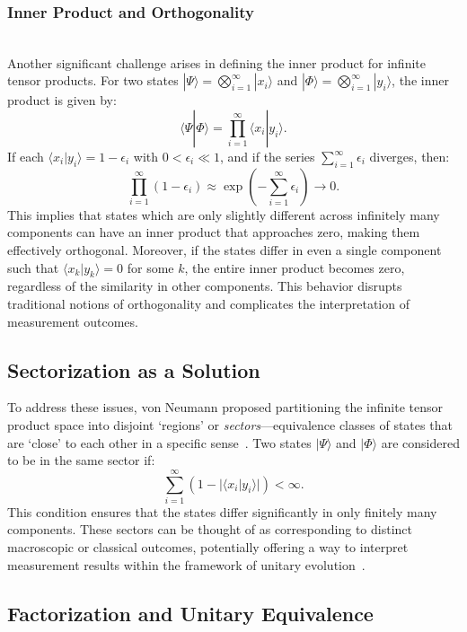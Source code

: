 \documentclass[shortAfour,sageh,times]{sagej}
\begin{document}
\subsubsection{Inner Product and Orthogonality} \hfill\\[-0.1in]

Another significant challenge arises in defining the inner product for infinite tensor products. For two states $|\Psi\rangle = \bigotimes_{i=1}^{\infty} | x _i\rangle$ and $|\Phi\rangle = \bigotimes_{i=1}^{\infty} | y _i\rangle$, the inner product is given by:
\[
\langle \Psi | \Phi \rangle = \prod_{i=1}^{\infty} \langle  x _i |  y _i \rangle.
\]
If each $\langle  x _i |  y _i \rangle = 1 - \epsilon_i$ with $0 < \epsilon_i \ll 1$, and if the series $\sum_{i=1}^{\infty} \epsilon_i$ diverges, then:
\[
\prod_{i=1}^{\infty} (1 - \epsilon_i) \approx \exp\left(-\sum_{i=1}^{\infty} \epsilon_i\right) \to 0.
\]
This implies that states which are only slightly different across infinitely many components can have an inner product that approaches zero, making them effectively orthogonal. Moreover, if the states differ in even a single component such that $\langle  x _k |  y _k \rangle = 0$ for some $k$, the entire inner product becomes zero, regardless of the similarity in other components. This behavior disrupts traditional notions of orthogonality and complicates the interpretation of measurement outcomes.

\subsection{Sectorization as a Solution}
\label{2025-idi-sectorization}

To address these issues, von Neumann proposed partitioning the infinite tensor product space into disjoint `regions' or \textit{sectors}---equivalence classes of states that are `close' to each other in a specific sense~\citep{vonNeumann1939}. Two states $|\Psi\rangle$ and $|\Phi\rangle$ are considered to be in the same sector if:
\[
\sum_{i=1}^{\infty} (1 - |\langle  x _i |  y _i \rangle|) < \infty.
\]
This condition ensures that the states differ significantly in only finitely many components. These sectors can be thought of as corresponding to distinct macroscopic or classical outcomes, potentially offering a way to interpret measurement results within the framework of unitary evolution~\citep{Grangier-2020,van-den-bossche-2023-a,van-den-bossche-2023-b,van-den-bossche-2023-c}.

\subsection{Factorization and Unitary Equivalence}
\end{document}
